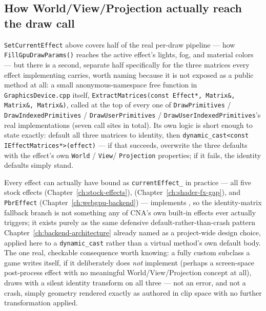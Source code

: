 \subsection{How World/View/Projection actually reach the draw call}
\label{sec:extract-matrices}

\texttt{SetCurrentEffect} above covers half of the real per-draw pipeline --- how
\texttt{FillGpuDrawParams()} reaches the active effect's lights, fog, and material colors ---
but there is a second, separate half specifically for the three matrices every effect
implementing  carries, worth naming because it is not exposed as a
public method at all: a small anonymous-namespace free function in \texttt{GraphicsDevice.cpp}
itself, \texttt{ExtractMatrices(const Effect*, Matrix\&, Matrix\&, Matrix\&)}, called at the top
of every one of \texttt{DrawPrimitives} / \texttt{DrawIndexedPrimitives} /
\texttt{DrawUserPrimitives} / \texttt{DrawUserIndexedPrimitives}'s real implementations (seven
call sites in total). Its own logic is short enough to state exactly: default all three
matrices to identity, then \texttt{dynamic\_cast<const IEffectMatrices*>(effect)} --- if that
succeeds, overwrite the three defaults with the effect's own \texttt{World} / \texttt{View}/%
\texttt{Projection} properties; if it fails, the identity defaults simply stand.

Every effect  can actually have bound as \texttt{currentEffect\_} in
practice --- all five stock effects (Chapter~\ref{ch:stock-effects}), 
(Chapter~\ref{ch:shader-fx-gap}), and \texttt{PbrEffect} (Chapter~\ref{ch:webgpu-backend}) ---
implements , so the identity-matrix fallback branch is not something
any of CNA's own built-in effects ever actually triggers; it exists purely as the same defensive
default-rather-than-crash pattern Chapter~\ref{ch:backend-architecture} already named as a
project-wide design choice, applied here to a \texttt{dynamic\_cast} rather than a virtual
method's own default body. The one real, checkable consequence worth knowing: a fully custom
 subclass a game writes itself, if it deliberately does \emph{not} implement
 (perhaps a screen-space post-process effect with no meaningful
World/View/Projection concept at all), draws with a silent identity transform on all three ---
not an error, and not a crash, simply geometry rendered exactly as authored in clip space with
no further transformation applied.


